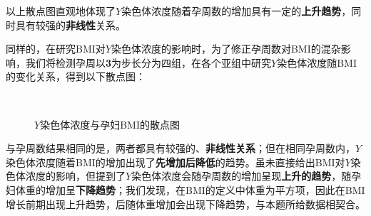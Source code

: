 \documentclass[12pt]{ctexart}
\begin{document}
	以上散点图直观地体现了$Y$染色体浓度随着孕周数的增加具有一定的\textbf{上升趋势}，同时具有较强的\textbf{非线性}关系。

	
		同样的，在研究BMI对$Y$染色体浓度的影响时，为了修正孕周数对BMI的混杂影响，我们将检测孕周以\textbf{3}为步长分为四组，在各个亚组中研究$Y$染色体浓度随BMI的变化关系，得到以下散点图：
		\begin{figure}[htbp]
			\centering
			 \\[1ex]
			\caption{$Y$染色体浓度与孕妇BMI的散点图}
		\end{figure}

	
	与孕周数结果相同的是，两者都具有较强的、\textbf{非线性关系}；但在相同孕周数内，$Y$染色体浓度随着BMI的增加出现了\textbf{先增加后降低}的趋势。\cite{canick}虽未直接给出BMI对$Y$染色体浓度的影响，但提到了$Y$染色体浓度会随孕周数的增加呈现\textbf{上升的趋势}，随孕妇体重的增加呈\textbf{下降趋势}；我们发现，在BMI的定义中体重为平方项，因此在BMI增长前期出现上升趋势，后随体重增加会出现下降趋势，与本题所给数据相契合。
	
\end{document}
